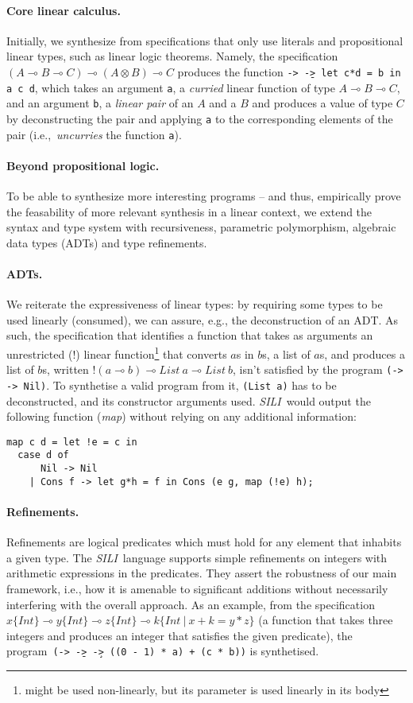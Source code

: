 \documentclass{llncs}
\newcommand{\lolli}{\multimap}
\newcommand{\tensor}{\otimes}
\newcommand{\bang}{{!}}
\newcommand{\mypara}[1]{\paragraph{\textbf{#1}.}}
\newcommand{\synname}{\emph{SILI}}
\begin{document}
\mypara{Core linear calculus} Initially, we synthesize from
specifications that only use literals and propositional linear types, such as linear logic theorems. Namely,
the specification $(A \lolli B \lolli C) \lolli (A \tensor B) \lolli C$ produces
the function \texttt{\a -> \b -> let c*d = b in a c d},
which takes an argument \texttt{a}, a
\emph{curried} linear function of type $A \lolli B \lolli C$,  and an
argument \texttt{b}, a \emph{linear
  pair} of an $A$ and a $B$ and produces a value of type $C$ by
deconstructing the pair and applying \texttt{a} to the
corresponding elements of the pair (i.e.,~\emph{uncurries} the
function \texttt{a}).


\mypara{Beyond propositional logic} To be able to synthesize more
interesting programs -- and thus, empirically prove the feasability of
more relevant synthesis in a linear context, we extend the syntax and
type system with recursiveness, parametric polymorphism, algebraic
data types (ADTs) and type refinements.


\mypara{ADTs} We reiterate the expressiveness of linear types: by requiring
some types to be used linearly (consumed), we can assure, e.g., the
deconstruction of an ADT. As such, the specification that identifies a function
that takes as arguments an unrestricted ($\bang$) linear function\footnote{might be used non-linearly, but its parameter is used
linearly in its body} 
that converts $a$s in $b$s, a list of $a$s, and produces a
list of $b$s, written $\bang(a \lolli b) \lolli List\ a \lolli List\ b$, isn't
satisfied by the program \texttt{(\x -> \y -> Nil)}. To synthetise
a valid program from it, \texttt{(List a)} has to be deconstructed,
and its constructor arguments used. \synname\ would output the following
function (\emph{map}) without relying on any additional information:
%
%
\begin{verbatim}
map c d = let !e = c in
  case d of
      Nil -> Nil
    | Cons f -> let g*h = f in Cons (e g, map (!e) h);
\end{verbatim}

\mypara{Refinements} Refinements are logical predicates
which must hold for any element that inhabits a given type. The \synname\
language supports simple refinements on integers with arithmetic
expressions in the predicates. They assert the robustness of our main
framework, i.e., how it is amenable to significant additions without
necessarily interfering with the overall approach.
%
As an example, from the specification $x \{Int\} \lolli y \{Int\} \lolli z
\{Int\} \lolli k \{Int\ \vert\ x + k = y * z\}$ (a function that takes three
integers and produces an integer that satisfies the given predicate), the
program\ \texttt{(\a -> \b -> \c -> ((0 - 1) * a) + (c * b))} is
synthetised.
\end{document}
